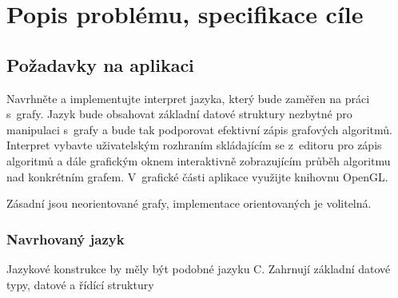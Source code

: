 \documentclass[11pt,twoside,a4paper]{book}
\begin{document}

\chapter{Popis problému, specifikace cíle}
\label{popis_problemu_specifikace_cile}



\section{Požadavky na aplikaci}

Navrhněte a implementujte interpret jazyka, který bude zaměřen na práci s~grafy. Jazyk bude obsahovat základní datové struktury nezbytné pro manipulaci s~grafy a bude tak podporovat efektivní zápis grafových algoritmů. Interpret vybavte uživatelským rozhraním skládajícím se z~editoru pro zápis algoritmů a dále grafickým oknem interaktivně zobrazujícím průběh algoritmu nad konkrétním grafem. V~grafické části aplikace využijte knihovnu OpenGL.

Zásadní jsou neorientované grafy, implementace orientovaných je volitelná.

\subsection{Navrhovaný jazyk}

Jazykové konstrukce by měly být podobné jazyku C. Zahrnují základní datové typy, datové a řídící struktury
\end{document}

